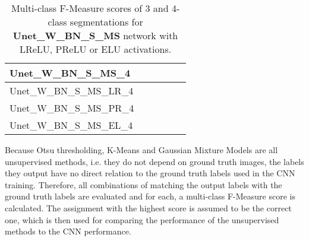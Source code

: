 \begin {table}
\begin{flushleft}
\begin {tabular}[!ht]{|l|l|l|l|l|l|}
			Unet\_W\_BN\_S\_MS\_4& & & & & \\ \hline
			Unet\_W\_BN\_S\_MS\_LR\_4& & & & & \\ \hline
			Unet\_W\_BN\_S\_MS\_PR\_4& & & & & \\ \hline
			Unet\_W\_BN\_S\_MS\_EL\_4& & & & & \\ \hline
		\end {tabular}
	\end {flushleft}
\caption[Multi-class F-Measure scores for networks with different activation functions.]{Multi-class F-Measure scores of 3 and 4-class segmentations for  \textbf{Unet\_W\_BN\_S\_MS} network with LReLU, PReLU or ELU activations.}
\label{tab:results5}
\end {table}


\noindent Because Otsu thresholding, K-Means and Gaussian Mixture Models are all unsupervised methods, i.e. they do not depend on ground truth images, the labels they output have no direct relation to the ground truth labels used in the CNN training. Therefore, all combinations of matching the output labels with the ground truth labels are evaluated and for each, a multi-class F-Measure score is calculated. The assignment with the highest score is assumed to be the correct one, which is then used for comparing the performance of the unsupervised methods to the CNN performance.\\


